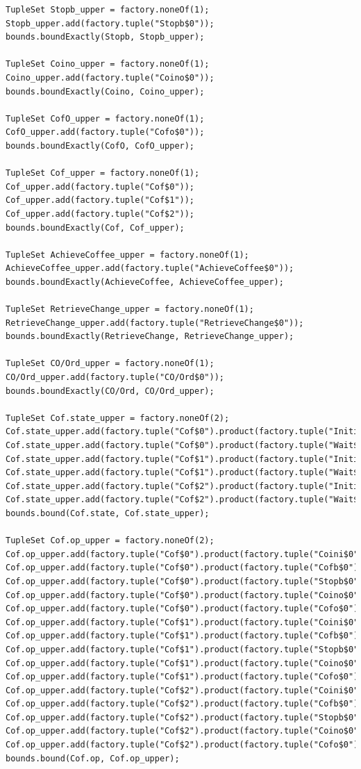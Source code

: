 \documentclass[a4paper,12pt]{report}
\begin{document}
\begin{verbatim}
TupleSet Stopb_upper = factory.noneOf(1);
Stopb_upper.add(factory.tuple("Stopb$0"));
bounds.boundExactly(Stopb, Stopb_upper);

TupleSet Coino_upper = factory.noneOf(1);
Coino_upper.add(factory.tuple("Coino$0"));
bounds.boundExactly(Coino, Coino_upper);

TupleSet CofO_upper = factory.noneOf(1);
CofO_upper.add(factory.tuple("Cofo$0"));
bounds.boundExactly(CofO, CofO_upper);

TupleSet Cof_upper = factory.noneOf(1);
Cof_upper.add(factory.tuple("Cof$0"));
Cof_upper.add(factory.tuple("Cof$1"));
Cof_upper.add(factory.tuple("Cof$2"));
bounds.boundExactly(Cof, Cof_upper);

TupleSet AchieveCoffee_upper = factory.noneOf(1);
AchieveCoffee_upper.add(factory.tuple("AchieveCoffee$0"));
bounds.boundExactly(AchieveCoffee, AchieveCoffee_upper);

TupleSet RetrieveChange_upper = factory.noneOf(1);
RetrieveChange_upper.add(factory.tuple("RetrieveChange$0"));
bounds.boundExactly(RetrieveChange, RetrieveChange_upper);

TupleSet CO/Ord_upper = factory.noneOf(1);
CO/Ord_upper.add(factory.tuple("CO/Ord$0"));
bounds.boundExactly(CO/Ord, CO/Ord_upper);

TupleSet Cof.state_upper = factory.noneOf(2);
Cof.state_upper.add(factory.tuple("Cof$0").product(factory.tuple("Initial$0")));
Cof.state_upper.add(factory.tuple("Cof$0").product(factory.tuple("Wait$0")));
Cof.state_upper.add(factory.tuple("Cof$1").product(factory.tuple("Initial$0")));
Cof.state_upper.add(factory.tuple("Cof$1").product(factory.tuple("Wait$0")));
Cof.state_upper.add(factory.tuple("Cof$2").product(factory.tuple("Initial$0")));
Cof.state_upper.add(factory.tuple("Cof$2").product(factory.tuple("Wait$0")));
bounds.bound(Cof.state, Cof.state_upper);

TupleSet Cof.op_upper = factory.noneOf(2);
Cof.op_upper.add(factory.tuple("Cof$0").product(factory.tuple("Coini$0")));
Cof.op_upper.add(factory.tuple("Cof$0").product(factory.tuple("Cofb$0")));
Cof.op_upper.add(factory.tuple("Cof$0").product(factory.tuple("Stopb$0")));
Cof.op_upper.add(factory.tuple("Cof$0").product(factory.tuple("Coino$0")));
Cof.op_upper.add(factory.tuple("Cof$0").product(factory.tuple("Cofo$0")));
Cof.op_upper.add(factory.tuple("Cof$1").product(factory.tuple("Coini$0")));
Cof.op_upper.add(factory.tuple("Cof$1").product(factory.tuple("Cofb$0")));
Cof.op_upper.add(factory.tuple("Cof$1").product(factory.tuple("Stopb$0")));
Cof.op_upper.add(factory.tuple("Cof$1").product(factory.tuple("Coino$0")));
Cof.op_upper.add(factory.tuple("Cof$1").product(factory.tuple("Cofo$0")));
Cof.op_upper.add(factory.tuple("Cof$2").product(factory.tuple("Coini$0")));
Cof.op_upper.add(factory.tuple("Cof$2").product(factory.tuple("Cofb$0")));
Cof.op_upper.add(factory.tuple("Cof$2").product(factory.tuple("Stopb$0")));
Cof.op_upper.add(factory.tuple("Cof$2").product(factory.tuple("Coino$0")));
Cof.op_upper.add(factory.tuple("Cof$2").product(factory.tuple("Cofo$0")));
bounds.bound(Cof.op, Cof.op_upper);


\end{verbatim}
\end{document}

